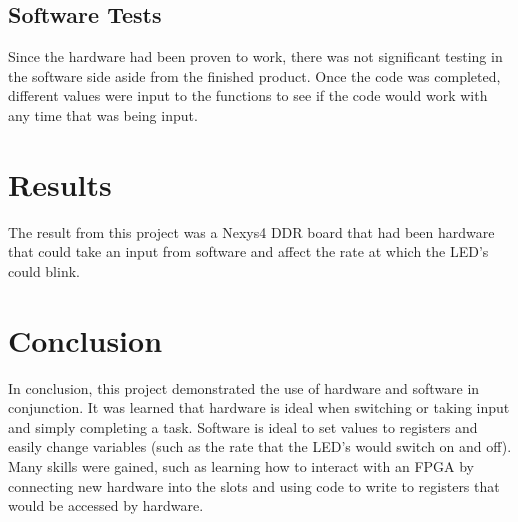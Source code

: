 \documentclass[11pt]{article}
\begin{document}
\subsection{Software Tests}
\quad Since the hardware had been proven to work, there was not significant testing in the software side aside from the finished product. Once the code was completed, different values were input to the functions to see if the code would work with any time that was being input. 

\section{Results}
\quad The result from this project was a Nexys4 DDR board that had been hardware that could take an input from software and affect the rate at which the LED's could blink. 


\section{Conclusion}
\quad In conclusion, this project demonstrated the use of hardware and software in conjunction. It was learned that hardware is ideal when switching or taking input and simply completing a task. Software is ideal to set values to registers and easily change variables (such as the rate that the LED's would switch on and off). Many skills were gained, such as learning how to interact with an FPGA by connecting new hardware into the slots and using code to write to registers that would be accessed by hardware. 
\end{document}

